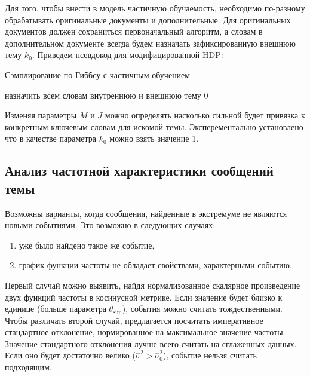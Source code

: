 \documentclass[12pt, a4paper]{article}
\DeclareMathOperator{\simu}{sim}
\begin{document}
  Для того, чтобы внести в модель частичную обучаемость, необходимо по-разному обрабатывать оригинальные документы и дополнительные. Для оригинальных документов должен сохраниться первоначальный алгоритм, а словам в дополнительном документе всегда будем назначать зафиксированную внешнюю тему $k_0$. Приведем псевдокод для модифицированной HDP:
  
  \begin{algorithm}[H]
  	\caption{Сэмплирование по Гиббсу с частичным обучением}
    \SetAlgoLined
  	назначить всем словам внутреннюю и внешнюю тему $0$\;
  \end{algorithm}
  
  Изменяя параметры $M$ и $J$ можно определять насколько сильной будет привязка к конкретным ключевым словам для искомой темы. Эксперементально установлено что в качестве параметра $k_0$ можно взять значение 1.
  
  \subsection{Анализ частотной характеристики сообщений темы}
  Возможны варианты, когда сообщения, найденные в экстремуме не являются новыми событиями. Это возможно в следующих случаях:
  \begin{enumerate}
  \item уже было найдено такое же событие,
  \item график функции частоты не обладает свойствами, характерными событию.
  \end{enumerate}
  
  Первый случай можно выявить, найдя нормализованное скалярное произведение двух функций частоты в косинусной метрике. Если значение будет близко к единице (больше параметра $\theta_{\simu}$), события можно считать тождественными. Чтобы различать второй случай, предлагается посчитать императивное стандартное отклонение, нормированное на максимальное значение частоты. Значение стандартного отклонения лучше всего считать на сглаженных данных. Если оно будет достаточно велико ($\hat{\sigma}^2 > \hat{\sigma}^2_0$), событие нельзя считать подходящим.
  
\end{document}
